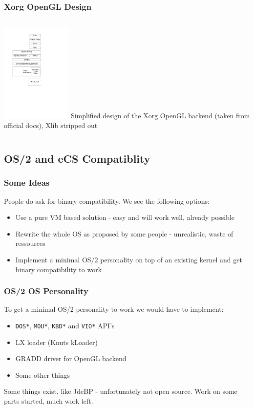 \documentclass{beamer}
\begin{document}
\begin{frame}
\frametitle{Xorg OpenGL Design}
\begin{columns}
\column[T]{5cm}
\includegraphics[width=3.5cm]{ogl-backend.pdf}
\column{5cm}
Simplified design of the Xorg OpenGL backend (taken from official docs), Xlib stripped out
\end{columns}
\end{frame}

\subsection{OS/2 and eCS Compatiblity}
\begin{frame}
\frametitle{Some Ideas}
People do ask for binary compatibility. We see the following options:
\begin{itemize}[<+->]
  \item Use a pure VM based solution - easy and will work well, already possible
  \item Rewrite the whole OS as proposed by some people - unrealistic, waste of ressources
  \item Implement a minimal OS/2 personality on top of an existing kernel and get binary compatibility to work
\end{itemize}
\end{frame}

\begin{frame}
\frametitle{OS/2 OS Personality}
To get a minimal OS/2 personality to work we would have to implement:
\begin{itemize}[<+->]
  \item \texttt{DOS*}, \texttt{MOU*}, \texttt{KBD*} and \texttt{VIO*} API's
  \item LX loader (Knuts kLoader)
  \item GRADD driver for OpenGL backend
  \item Some other things
\end{itemize}
Some things exist, like JdeBP - unfortunately not open source. Work on some
parts started, much work left.
\end{frame}
\end{document}
